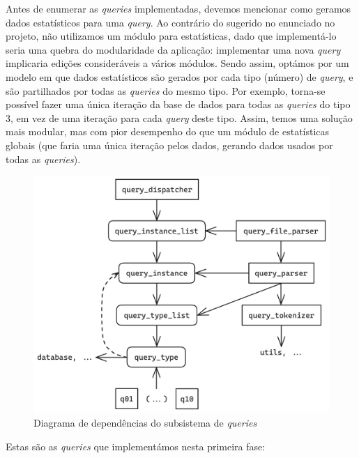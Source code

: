 \documentclass[12pt, a4paper]{article}
\begin{document}
Antes de enumerar as \emph{queries} implementadas, devemos mencionar como geramos dados estatísticos
para uma \emph{query}. Ao contrário do sugerido no enunciado no projeto, não utilizamos um módulo
para estatísticas, dado que implementá-lo seria uma quebra do modularidade da aplicação: implementar
uma nova \emph{query} implicaria edições consideráveis a vários módulos. Sendo assim, optámos por um
modelo em que dados estatísticos são gerados por cada tipo (número) de \emph{query}, e são
partilhados por todas as \emph{queries} do mesmo tipo. Por exemplo, torna-se possível fazer uma
única iteração da base de dados para todas as \emph{queries} do tipo 3, em vez de uma iteração para
cada \emph{query} deste tipo. Assim, temos uma solução mais modular, mas com pior desempenho do que
um módulo de estatísticas globais (que faria uma única iteração pelos dados, gerando dados usados
por todas as \emph{queries}).

\begin{figure}[ht]
    \centering
    \includegraphics[scale=0.19]{res/queries.png}
    \caption{Diagrama de dependências do subsistema de \emph{queries}}
    \label{fig:queries}
\end{figure}

Estas são as \emph{queries} que implementámos nesta primeira fase:
\end{document}
